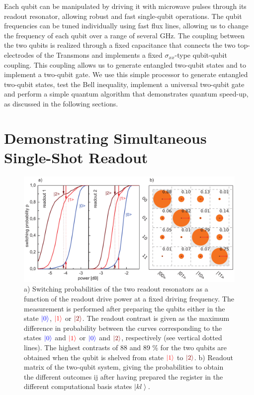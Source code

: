 Each qubit can be manipulated by driving it with microwave pulses
through its readout resonator, allowing robust and fast single-qubit
operations. The qubit frequencies can be tuned individually using
fast flux lines, allowing us to change the frequency of each qubit
over a range of several GHz. The coupling between the two qubits is
realized through a fixed capacitance that connects the two top-electrodes
of the Transmons and implements a fixed $\sigma_{xx}$-type qubit-qubit
coupling. This coupling allows us to generate entangled two-qubit
states and to implement a two-qubit gate. We use this simple processor
to generate entangled two-qubit states, test the Bell inequality,
implement a universal two-qubit gate and perform a simple quantum
algorithm that demonstrates quantum speed-up, as discussed
in the following sections.


\section{Demonstrating Simultaneous Single-Shot Readout}

%
\begin{figure}[ht!]
 \centering
\includegraphics[width=\textwidth]{"./data/ct5/2011_04_21 - grover and tomo/good_data/s curves and readout"}
\caption[Switching probabilities of the two qubit readouts as a function of
the readout excitation power]{a) Switching probabilities of the two readout resonators
as a function of the readout drive power at a fixed driving frequency.
The measurement is performed after preparing the qubits either in the state
${\color{blue}{\left| 0 \right>}}$, ${\color{red}{\left| 1 \right>}}$ or ${\color{brown}{\ket{2}}}$.
The readout contrast is given as the maximum difference in probability between
the curves corresponding to the states ${\color{blue}{\left| 0 \right>}}$
and ${\color{red}{\left| 1 \right>}}$ or ${\color{blue}{\left| 0 \right>}}$ and ${\color{brown}{\ket{2}}}$, respectively (see vertical  dotted lines). The highest contrasts of 88 and 89 \% for the two qubits are obtained when the qubit
is shelved from state ${\color{red}{\left| 1 \right>}}$ to ${\color{brown}{\ket{2}}}$.
b) Readout matrix of the two-qubit system, giving the probabilities to obtain the different outcomes ij after having
prepared the register in the different computational basis states
$\left|kl\right\rangle $.}


\label{fig:qubit_readout_characteristics} %
\end{figure}


